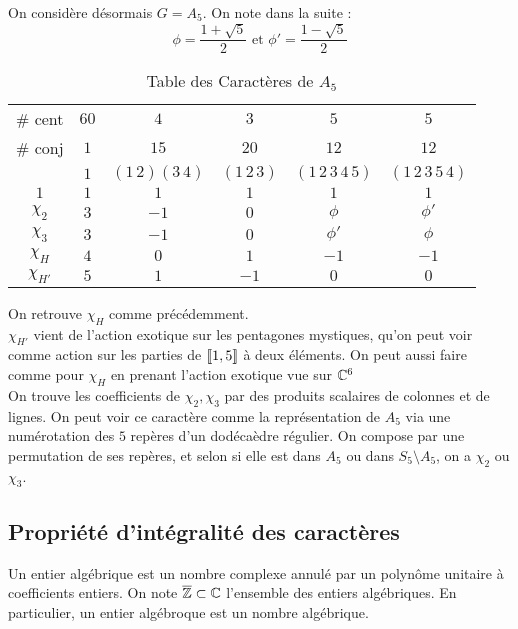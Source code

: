 \documentclass{cours}
\begin{document}
\begin{proposition}
    On considère désormais $G = A_{5}$. On note dans la suite : 
    \[
        \phi = \frac{1 +\sqrt{5}}{2} \text{ et } \phi' = \frac{1 - \sqrt{5}}{2}
    \]
    \begin{table}[ht]
        \centering
        \begin{tabular}{c|ccccc}
            \# cent & $60$ & $4$ & $3$ & $5$ & $5$\\
            \# conj & $1$ & $15$ & $20$& $12$ & $12$ \\
            & $1$ & $(1\, 2)(3\, 4)$ & $(1\, 2\, 3)$ & $(1\, 2\, 3\, 4\, 5)$ & $(1\, 2\, 3\, 5\, 4)$\\
            \midrule
            $1$ & $1$ & $1$ & $1$ & $1$ & $1$\\
            $\chi_{2}$ & $3$ & $-1$ & $0$ & $\phi$ & $\phi'$\\
            $\chi_{3}$ & $3$ & $-1$ & $0$ & $\phi'$ & $\phi$\\
            $\chi_{H}$ & $4$ & $0$ & $1$ & $-1$ & $-1$\\
            $\chi_{H'}$ & $5$ & $1$ & $-1$ & $0$ & $0$
        \end{tabular}
        \caption{Table des Caractères de $A_{5}$}
    \end{table}
    On retrouve $\chi_{H}$ comme précédemment.\\
    $\chi_{H'}$ vient de l'action exotique sur les pentagones mystiques, qu'on peut voir comme action sur les parties de $\left\llbracket 1, 5\right\rrbracket$ à deux éléments. On peut aussi faire comme pour $\chi_{H}$ en prenant l'action exotique vue sur $\mathbb{C}^{6}$\\
    On trouve les coefficients de $\chi_{2}, \chi_{3}$ par des produits scalaires de colonnes et de lignes. On peut voir ce caractère comme la représentation de $A_{5}$ via une numérotation des $5$ repères d'un dodécaèdre régulier. On compose par une permutation de ses repères, et selon si elle est dans $A_{5}$ ou dans $S_{5}\setminus A_{5}$, on a $\chi_{2}$ ou $\chi_{3}$.
\end{proposition}

\subsection{Propriété d'intégralité des caractères}
\begin{definition}
    Un entier algébrique est un nombre complexe annulé par un polynôme unitaire à coefficients entiers. On note $\overline{\mathbb{Z}} \subset \mathbb{C}$ l'ensemble des entiers algébriques. En particulier, un entier algébroque est un nombre algébrique. 
\end{definition}
\end{document}
